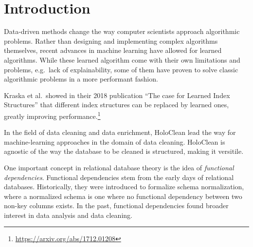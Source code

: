 \section{Introduction}
Data-driven methods change the way computer scientists approach algorithmic problems.
Rather than designing and implementing complex algorithms themselves, recent advances in machine learning have allowed for learned algorithms.
While these learned algorithm come with their own limitations and problems, e.g.\ lack of explainability, some of them have proven to solve classic algorithmic problems in a more performant fashion.

Kraska et al.\ showed in their 2018 publication ``The case for Learned Index Structures'' that different index structures can be replaced by learned ones, greatly improving performance.\footnote{\url{https://arxiv.org/abs/1712.01208}}

In the field of data cleaning and data enrichment, HoloClean lead the way for machine-learning approaches in the domain of data cleaning.
HoloClean is agnostic of the way the database to be cleaned is structured, making it versitile.

One important concept in relational database theory is the idea of \emph{functional dependencies}.
Functional dependencies stem from the early days of relational databases.
Historically, they were introduced to formalize schema normalization, where a normalized schema is one where no functional dependency between two non-key columns exists.
In the past, functional dependencies found broader interest in data analysis and data cleaning.
